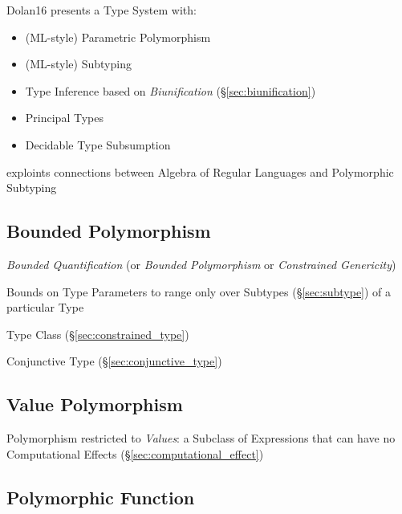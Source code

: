 Dolan16 presents a Type System with:
\begin{itemize}
  \item (ML-style) Parametric Polymorphism
  \item (ML-style) Subtyping
  \item Type Inference based on \emph{Biunification}
    (\S\ref{sec:biunification})
  \item Principal Types
  \item Decidable Type Subsumption
\end{itemize}

exploints connections between Algebra of Regular Languages and
Polymorphic Subtyping



\subsection{Bounded Polymorphism}\label{sec:bounded_polymorphism}

\emph{Bounded Quantification} (or \emph{Bounded Polymorphism} or
\emph{Constrained Genericity})

Bounds on Type Parameters to range only over Subtypes
(\S\ref{sec:subtype}) of a particular Type

Type Class (\S\ref{sec:constrained_type})

Conjunctive Type (\S\ref{sec:conjunctive_type})



\subsection{Value Polymorphism}\label{sec:value_polymorphism}

Polymorphism restricted to \emph{Values}: a Subclass of Expressions
that can have no Computational Effects
(\S\ref{sec:computational_effect})



\subsection{Polymorphic Function}\label{sec:polymorphic_function}

